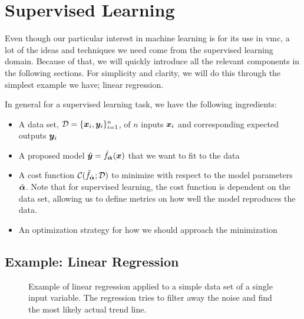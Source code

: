 \documentclass[Thesis.tex]{subfiles}
\begin{document}
\section{Supervised Learning}

Even though our particular interest in machine learning is for its use in \gls{vmc}, a
lot of the ideas and techniques we need come from the supervised learning
domain. Because of that, we will quickly introduce all the relevant components in the
following sections. For simplicity and clarity, we will do this through the
simplest example we have; linear regression.

In general for a supervised learning task, we have the following ingredients:

\begin{itemize}
\item A data set, $\mathcal{D} = \{\bm{x}_i, \bm{y}_i\}_{i=1}^n$, of $n$ inputs $\bm{x}_i$
  and corresponding expected outputs $\bm{y}_i$
\item A proposed model $\hat{\bm{y}} = \hat f_{\hat{\bm{\alpha}}}(\bm{x})$ that we want to
    fit to the data
\item A cost function $\mathcal{C}(\hat f_{\hat{\bm{\alpha}}}; \mathcal{D})$
  to minimize with respect to the model parameters $\hat {\bm{\alpha}}$. Note that for
  supervised learning, the cost function is dependent on the data set, allowing
  us to define metrics on how well the model reproduces the data.
\item An optimization strategy for how we should approach the minimization
\end{itemize}


\subsection{Example: Linear Regression}

\begin{figure}[h]
  \centering
  \resizebox{0.7\linewidth}{!}{%
      
  }
  \caption[Example of linear regression]{Example of linear regression applied to a simple data set of a single
    input variable. The regression tries to filter away the noise and find the
    most likely actual trend line.}
  \label{fig:linear-regression-example}
\end{figure}
\end{document}
